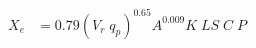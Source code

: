 \documentclass[fleqn, oneside, 11pt]{article}%
\begin{document}
\begin{preview}
\begin{align*}%
X_{e} & = 0.79(V_{r}\;q_{p})^{0.65} A^{0.009} K\;LS\;C\;P \\ 
\end{align*} 
\end{preview}
\end{document}
